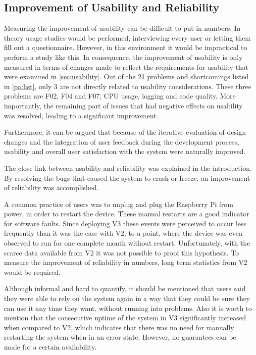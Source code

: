 \documentclass[12pt]{article}
\begin{document}
\subsection{Improvement of Usability and Reliability}
Measuring the improvement of usability can be difficult to put in numbers.
In theory usage studies would be performed, interviewing every user or letting them fill out a questionnaire.
However, in this environment it would be impractical to perform a study like this.
In consequence, the improvement of usability is only measured in terms of changes made
to reflect the requirements for usability that were examined in \autoref{sec:usability}.
Out of the 21 problems and shortcomings listed in \autoref{pa:list},
only 3 are not directly related to usability considerations.
These three problems are F02, F04 and F07; CPU usage, logging and code quality.
More importantly, the remaining part of issues that had negative effects on usability was resolved, 
leading to a significant improvement.

Furthermore, it can be argued that because of the iterative evaluation of design changes
and the integration of user feedback during the development process,
usability and overall user satisfaction with the system were naturally improved.

The close link between usability and reliability was explained in the introduction.
By resolving the bugs that caused the system to crash or freeze,
an improvement of reliability was accomplished.

A common practice of users was to unplug and plug the Raspberry Pi from power, in order to restart the device.
These manual restarts are a good indicator for software faults.
Since deploying V3 these events were perceived to occur less frequently than it was the case with V2,
to a point, where the device was even observed to run for one complete month without restart.
Unfortunately, with the scarce data available from V2 it was not possible to proof this hypothesis.
To measure the improvement of reliability in numbers, long term statistics from V2 would be required.

Although informal and hard to quantify, it should be mentioned that users said they were able to rely on the system again
in a way that they could be sure they can use it any time they want, without running into problems. 
Also it is worth to mention that the consecutive uptime of the system in V3 significantly increased when compared to V2,
which indicates that there was no need for manually restarting the system when in an error state.
However, no guarantees can be made for a certain availability.
\end{document}
